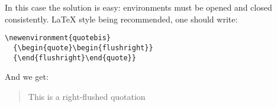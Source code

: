 \documentclass{article}
\begin{document}
In this case the solution is easy: environments must be opened and
closed consistently. {\LaTeX} style being recommended, one should write:
\begin{verbatim}
\newenvironment{quotebis}
  {\begin{quote}\begin{flushright}}
  {\end{flushright}\end{quote}}
\end{verbatim}
And we get:
\begin{htmlout}\newenvironment{quotebis}{\begin{quote}\begin{flushright}}{\end{flushright}\end{quote}}
\begin{quotebis}
This is a right-flushed quotation
\end{quotebis}
\end{htmlout}
\end{document}

